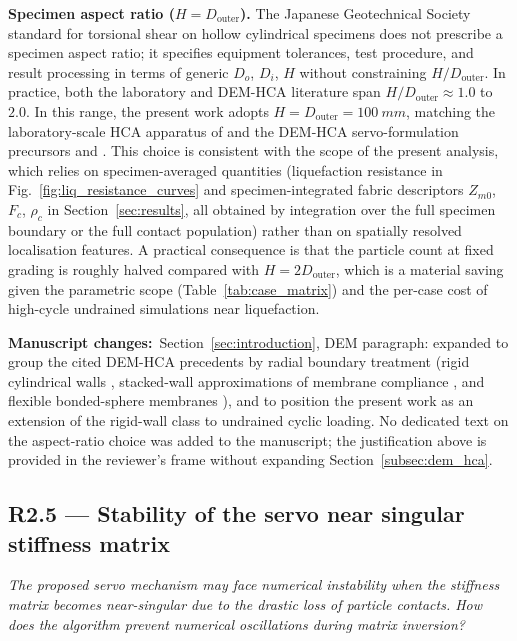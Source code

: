 \documentclass[11pt,a4paper]{article}
\newenvironment{rcomment}
  {\begin{leftbar}\color{black!75}\itshape}
  {\end{leftbar}\vspace{0.3em}}
\newcommand{\changed}[1]{\par\noindent\textbf{Manuscript changes:}\ #1\par}
\begin{document}
\medskip
\noindent\textbf{Specimen aspect ratio ($H=D_{\text{outer}}$).}
The Japanese Geotechnical Society standard for torsional shear on
hollow cylindrical specimens \citep{JGS0551_2020} does not prescribe
a specimen aspect ratio; it specifies equipment tolerances, test
procedure, and result processing in terms of generic $D_o$, $D_i$,
$H$ without constraining $H/D_{\text{outer}}$. In practice, both
the laboratory and DEM-HCA literature span
$H/D_{\text{outer}}\approx 1.0$ to $2.0$. In this range, the present work adopts
$H=D_{\text{outer}}=\SI{100}{mm}$, matching the laboratory-scale
HCA apparatus of \citet{Vargas2020} and the DEM-HCA
servo-formulation precursors \citet{Han2024jgs} and \citet{Ma2024}.
This choice is consistent with the scope of the present analysis,
which relies on specimen-averaged quantities (liquefaction
resistance in Fig.~\ref{fig:liq_resistance_curves} and
specimen-integrated fabric descriptors $Z_{m0}$, $F_c$, $\rho_c$ in
Section~\ref{sec:results}, all obtained by integration over the full
specimen boundary or the full contact population) rather than on
spatially resolved localisation features. A practical
consequence is that the particle count at fixed grading is roughly
halved compared with $H=2D_{\text{outer}}$, which is a material
saving given the parametric scope (Table~\ref{tab:case_matrix})
and the per-case cost of high-cycle undrained simulations near
liquefaction.

\changed{Section~\ref{sec:introduction}, DEM paragraph: expanded to
group the cited DEM-HCA precedents by radial boundary treatment
(rigid cylindrical walls \citep{Shi2021,Liu2021}, stacked-wall
approximations of membrane compliance
\citep{LiGuoZhang2014,LiZhangGutierrez2015,LiChenGutierrez2017}, and
flexible bonded-sphere membranes
\citep{Song2024,Song2024suffusion}), and to position the present
work as an extension of the rigid-wall class to undrained cyclic
loading. No dedicated text on the aspect-ratio choice was
added to the manuscript; the justification above is provided in the
reviewer's frame without expanding Section~\ref{subsec:dem_hca}.}

\subsection*{R2.5 --- Stability of the servo near singular stiffness matrix}

\begin{rcomment}
The proposed servo mechanism may face numerical instability when the
stiffness matrix becomes near-singular due to the drastic loss of particle
contacts. How does the algorithm prevent numerical oscillations during
matrix inversion?
\end{rcomment}
\end{document}
